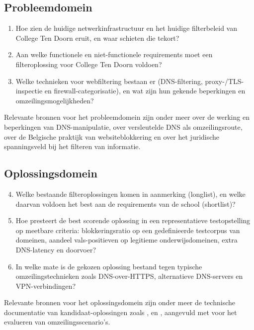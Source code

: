 \documentclass{hogent-article}
\begin{document}
\subsection{Probleemdomein}
\begin{enumerate}
    \item Hoe zien de huidige netwerkinfrastructuur en het huidige filterbeleid van College Ten Doorn eruit, en waar schieten die tekort?
    \item Aan welke functionele en niet-functionele requirements moet een filteroplossing voor College Ten Doorn voldoen?
    \item Welke technieken voor webfiltering bestaan er (DNS-filtering, proxy-/TLS-inspectie en firewall-categorisatie), en wat zijn hun gekende beperkingen en omzeilingsmogelijkheden?
\end{enumerate}
Relevante bronnen voor het probleemdomein zijn onder meer \textcite{Pearce2017} over de werking en beperkingen van DNS-manipulatie, \textcite{Hoffman2018} over versleutelde DNS als omzeilingsroute, \textcite{Royer2019} over de Belgische praktijk van websiteblokkering en \textcite{Ombelet2015} over het juridische spanningsveld bij het filteren van informatie.

\subsection{Oplossingsdomein}
\begin{enumerate}
    \setcounter{enumi}{3}
    \item Welke bestaande filteroplossingen komen in aanmerking (longlist), en welke daarvan voldoen het best aan de requirements van de school (shortlist)?
    \item Hoe presteert de best scorende oplossing in een representatieve testopstelling op meetbare criteria: blokkeringsratio op een gedefinieerde testcorpus van domeinen, aandeel vals-positieven op legitieme onderwijsdomeinen, extra DNS-latency en doorvoer?
    \item In welke mate is de gekozen oplossing bestand tegen typische omzeilingstechnieken zoals DNS-over-HTTPS, alternatieve DNS-servers en VPN-verbindingen?
\end{enumerate}
Relevante bronnen voor het oplossingsdomein zijn onder meer de technische documentatie van kandidaat-oplossingen zoals \textcite{PiHole2026}, \textcite{Netgate2026} en \textcite{Cisco2026}, aangevuld met \textcite{Hoffman2018} voor het evalueren van omzeilingsscenario's.
\end{document}
